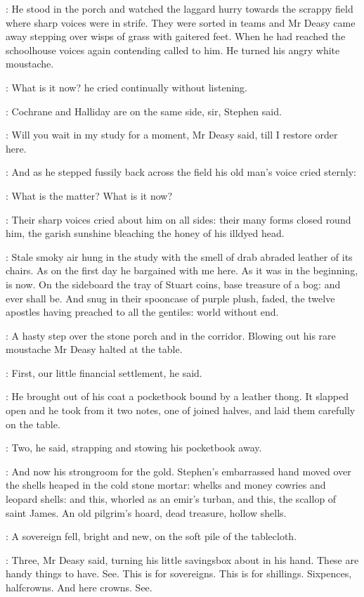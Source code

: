:
He stood in the porch and watched the laggard hurry towards the
scrappy field where sharp voices were in strife. They were sorted in teams
and Mr Deasy came away stepping over wisps of grass with gaitered feet.
When he had reached the schoolhouse voices again contending called to
him. He turned his angry white moustache.

\deasy:
What is it now? he cried continually without listening.

\Stephen:
Cochrane and Halliday are on the same side, sir, Stephen said.

\deasy:
Will you wait in my study for a moment, Mr Deasy said, till I restore
order here.


:
And as he stepped fussily back across the field his old man's voice
cried sternly:

\deasy:
What is the matter? What is it now?

:
Their sharp voices cried about him on all sides: their many forms
closed round him, the garish sunshine bleaching the honey of his illdyed
head.

:
Stale smoky air hung in the study with the smell of drab abraded
leather of its chairs. As on the first day he bargained with me here. As
it was in the beginning, is now. On the sideboard the tray of Stuart
coins, base treasure of a bog: and ever shall be. And snug in their
spooncase of purple plush, faded, the twelve apostles having preached to
all the gentiles: world without end.

:
A hasty step over the stone porch and in the corridor. Blowing out his
rare moustache Mr Deasy halted at the table.

\deasy:
First, our little financial settlement, he said.


:
He brought out of his coat a pocketbook bound by a leather thong. It
slapped open and he took from it two notes, one of joined halves, and laid
them carefully on the table.

\deasy:
Two, he said, strapping and stowing his pocketbook away.

:
And now his strongroom for the gold. Stephen's embarrassed hand
moved over the shells heaped in the cold stone mortar: whelks and money
cowries and leopard shells: and this, whorled as an emir's turban, and
this, the scallop of saint James. An old pilgrim's hoard, dead treasure,
hollow shells.

:
A sovereign fell, bright and new, on the soft pile of the tablecloth.

\deasy:
Three, Mr Deasy said, turning his little savingsbox about in his hand.
These are handy things to have. See. This is for sovereigns. This is for
shillings. Sixpences, halfcrowns. And here crowns. See.

